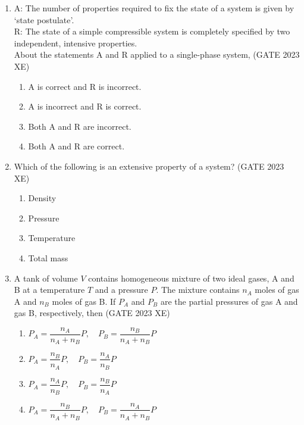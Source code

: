 \documentclass[journal,12pt,onecolumn]{IEEEtran}
\begin{document}
\begin{enumerate}

\item A: The number of properties required to fix the state of a system is given by ‘state postulate’. \\
R: The state of a simple compressible system is completely specified by two independent, intensive properties. \\
About the statements A and R applied to a single-phase system,
\hfill{(GATE 2023 XE)}

\begin{multicols}{2}
\begin{enumerate}
\item A is correct and R is incorrect.
\item A is incorrect and R is correct.
\item Both A and R are incorrect.
\item Both A and R are correct.
\end{enumerate}
\end{multicols}

\item Which of the following is an extensive property of a system?
\hfill{(GATE 2023 XE)}

\begin{multicols}{2}
\begin{enumerate}
\item Density
\item Pressure
\item Temperature
\item Total mass
\end{enumerate}
\end{multicols}

\item A tank of volume $V$ contains homogeneous mixture of two ideal gases, A and B at a temperature $T$ and a pressure $P$. The mixture contains $n_A$ moles of gas A and $n_B$ moles of gas B. If $P_A$ and $P_B$ are the partial pressures of gas A and gas B, respectively, then
\hfill{(GATE 2023 XE)}

\begin{multicols}{2}
\begin{enumerate}
\item $P_A=\dfrac{n_A}{n_A+n_B}P,\quad P_B=\dfrac{n_B}{n_A+n_B}P$
\item $P_A=\dfrac{n_B}{n_A}P,\quad P_B=\dfrac{n_A}{n_B}P$
\item $P_A=\dfrac{n_A}{n_B}P,\quad P_B=\dfrac{n_B}{n_A}P$
\item $P_A=\dfrac{n_B}{n_A+n_B}P,\quad P_B=\dfrac{n_A}{n_A+n_B}P$
\end{enumerate}
\end{multicols}


\end{enumerate}
\end{document}
